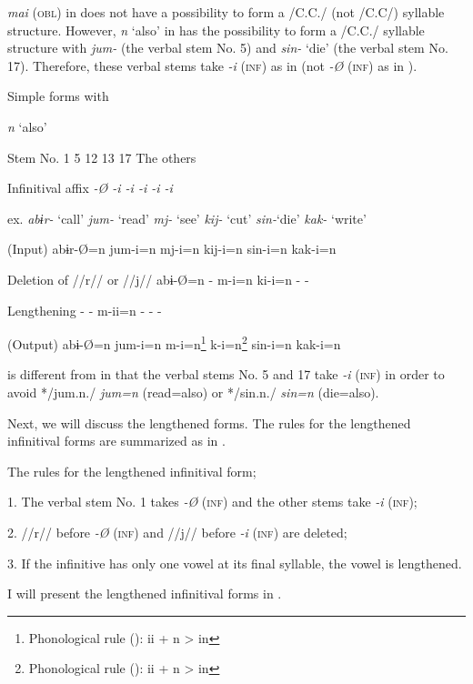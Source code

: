 \textit{mai} (\textsc{obl}) in  does not have a possibility to form a /C.C./ (not /C.C/) syllable structure. However, \textit{n} ‘also’ in  has the possibility to form a /C.C./ syllable structure with \textit{jum-} (the verbal stem No. 5) and \textit{sin-} ‘die’ (the verbal stem No. 17). Therefore, these verbal stems take \textit{-i} (\textsc{inf}) as in  (not \textit{-Ø} (\textsc{inf}) as in ).

\begin{table}
\caption{\label{tab:key:82}Simple forms with} \textmd{\textit{n} }\textmd{‘also’}

Stem No.  1  5  12  13  17  The others

Infinitival affix  \textit{-Ø  -i  -i  -i  -i  -i}

ex.  \textit{abɨr-} ‘call’  \textit{jum-} ‘read’  \textit{mj-} ‘see’  \textit{kij-} ‘cut’  \textit{sin-}‘die’  \textit{kak-} ‘write’

(Input)  abɨr-Ø=n  jum-i=n  mj-i=n  kij-i=n  sin-i=n  kak-i=n

Deletion of //r// or //j//  abɨ-Ø=n  -  m-i=n  ki-i=n  -  -

Lengthening  -  -  m-ii=n  -  -  -

(Output)  abɨ-Ø=n  jum-i=n  m-i=n\footnote{Phonological rule (): ii + n > in}  k-i=n\footnote{Phonological rule (): ii + n > in}  sin-i=n  kak-i=n
\end{table}

 is different from  in that the verbal stems No. 5 and 17 take \textit{-i} (\textsc{inf}) in order to avoid */jum.n./ \textit{jum=n} (read=also) or */sin.n./ \textit{sin=n} (die=also).

  Next, we will discuss the lengthened forms. The rules for the lengthened infinitival forms are summarized as in .

\ea\label{ex:8-107}
  The rules for the lengthened infinitival form;

  1.  The verbal stem No. 1 takes \textit{-Ø} (\textsc{inf}) and the other stems take \textit{-i} (\textsc{inf});

  2.  //r// before \textit{-Ø} (\textsc{inf}) and //j// before \textit{-i} (\textsc{inf}) are deleted;

  3.  If the infinitive has only one vowel at its final syllable, the vowel is lengthened.
\z

I will present the lengthened infinitival forms in .

